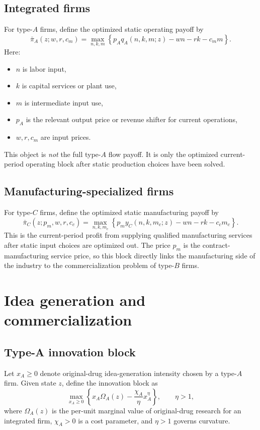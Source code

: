 \documentclass[12pt,fontset=none]{ctexart}
\begin{document}
\subsection{Integrated firms}

For type-$A$ firms, define the optimized static operating payoff by
\[
\bar{\pi}_A(z;w,r,c_m)
=
\max_{n,k,m}
\left\{
p_A q_A(n,k,m;z)-wn-rk-c_m m
\right\}.
\]
Here:
\begin{itemize}[leftmargin=2em]
    \item $n$ is labor input,
    \item $k$ is capital services or plant use,
    \item $m$ is intermediate input use,
    \item $p_A$ is the relevant output price or revenue shifter for current operations,
    \item $w,r,c_m$ are input prices.
\end{itemize}
This object is \emph{not} the full type-$A$ flow payoff. It is only the optimized
current-period operating block after static production choices have been solved.

\subsection{Manufacturing-specialized firms}

For type-$C$ firms, define the optimized static manufacturing payoff by
\[
\bar{\pi}_C(z;p_m,w,r,c_c)
=
\max_{n,k,m_c}
\left\{
p_m y_C(n,k,m_c;z)-wn-rk-c_c m_c
\right\}.
\]
This is the current-period profit from supplying qualified manufacturing services
after static input choices are optimized out. The price $p_m$ is the contract-manufacturing
service price, so this block directly links the manufacturing side of the industry
to the commercialization problem of type-$B$ firms.

\section{Idea generation and commercialization}

\subsection{Type-A innovation block}

Let $x_A\ge 0$ denote original-drug idea-generation intensity chosen by a type-$A$ firm.
Given state $z$, define the innovation block as
\[
\max_{x_A\ge 0}
\left\{
x_A\Omega_A(z)-\frac{\chi_A}{\eta}x_A^\eta
\right\},
\qquad \eta>1,
\]
where $\Omega_A(z)$ is the per-unit marginal value of original-drug research for
an integrated firm, $\chi_A>0$ is a cost parameter, and $\eta>1$ governs curvature.
\end{document}
